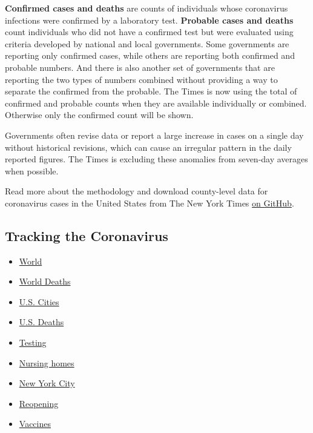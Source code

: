 \textbf{Confirmed cases and deaths} are counts of individuals whose
coronavirus infections were confirmed by a laboratory test.
\textbf{Probable cases and deaths} count individuals who did not have a
confirmed test but were evaluated using criteria developed by national
and local governments. Some governments are reporting only confirmed
cases, while others are reporting both confirmed and probable numbers.
And there is also another set of governments that are reporting the two
types of numbers combined without providing a way to separate the
confirmed from the probable. The Times is now using the total of
confirmed and probable counts when they are available individually or
combined. Otherwise only the confirmed count will be shown.

Governments often revise data or report a large increase in cases on a
single day without historical revisions, which can cause an irregular
pattern in the daily reported figures. The Times is excluding these
anomalies from seven-day averages when possible.

Read more about the methodology and download county-level data for
coronavirus cases in the United States from The New York Times
\href{https://github.com/nytimes/covid-19-data}{on GitHub}.

\hypertarget{tracking-the-coronavirus}{%
\subsection{Tracking the Coronavirus}\label{tracking-the-coronavirus}}

\begin{itemize}
\tightlist
\item
  \href{https://www.nytimes.com/interactive/2020/world/coronavirus-maps.html}{World}
\item
  \href{https://www.nytimes.com/interactive/2020/04/21/world/coronavirus-missing-deaths.html}{World
  Deaths}
\item
  \href{https://www.nytimes.com/interactive/2020/04/23/upshot/five-ways-to-monitor-coronavirus-outbreak-us.html}{U.S.
  Cities}
\item
  \href{https://www.nytimes.com/interactive/2020/05/05/us/coronavirus-death-toll-us.html}{U.S.
  Deaths}
\item
  \href{https://www.nytimes.com/interactive/2020/us/coronavirus-testing.html}{Testing}
\item
  \href{https://www.nytimes.com/interactive/2020/us/coronavirus-nursing-homes.html}{Nursing
  homes}
\item
  \href{https://www.nytimes.com/interactive/2020/nyregion/new-york-city-coronavirus-cases.html}{New
  York City}
\item
  \href{https://www.nytimes.com/interactive/2020/us/states-reopen-map-coronavirus.html}{Reopening}
\item
  \href{https://www.nytimes.com/interactive/2020/science/coronavirus-vaccine-tracker.html}{Vaccines}
\end{itemize}

